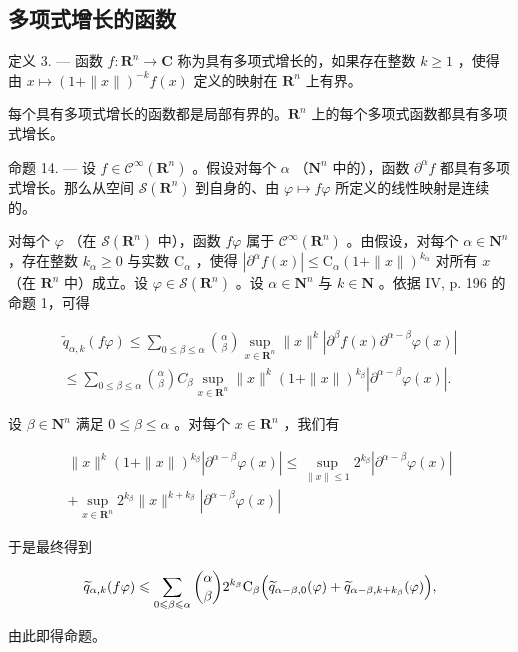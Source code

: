 \subsection{多项式增长的函数}

定义 3. --- 函数 \(f\colon\mathbf{R}^{n}\to\mathbf{C}\) 称为具有多项式增长的，如果存在整数 \(k\geqslant1\) ，使得由 \(x\mapsto(1+\|x\|)^{-k}f(x)\) 定义的映射在 \(\mathbf{R}^{n}\) 上有界。

每个具有多项式增长的函数都是局部有界的。\(\mathbf{R}^{n}\) 上的每个多项式函数都具有多项式增长。

命题 14. --- 设 \(f \in \mathcal{C}^{\infty}(\mathbf{R}^{n})\) 。假设对每个 \(\alpha\) （\(\mathbf{N}^{n}\) 中的），函数 \(\partial^{\alpha}f\) 都具有多项式增长。那么从空间 \(\mathcal{S}(\mathbf{R}^{n})\) 到自身的、由 \(\varphi \mapsto f\varphi\) 所定义的线性映射是连续的。

对每个 \(\varphi\) （在 \(\mathcal{S}(\mathbf{R}^{n})\) 中），函数 \(f\varphi\) 属于 \(\mathcal{C}^{\infty}(\mathbf{R}^{n})\) 。由假设，对每个 \(\alpha \in \mathbf{N}^{n}\) ，存在整数 \(k_{\alpha} \geqslant 0\) 与实数 \(\mathrm{C}_{\alpha}\) ，使得 \(|\partial^{\alpha}f(x)| \leqslant \mathrm{C}_{\alpha}(1 + \|x\|)^{k_{\alpha}}\) 对所有 \(x\) （在 \(\mathbf{R}^{n}\) 中）成立。设 \(\varphi \in \mathcal{S}(\mathbf{R}^{n})\) 。设 \(\alpha \in \mathbf{N}^{n}\) 与 \(k \in \mathbf{N}\) 。依据 IV, p. 196 的命题 1，可得

\[
\begin{array}{l} \widetilde {q} _ {\alpha , k} (f \varphi) \leqslant \sum_ {0 \leqslant \beta \leqslant \alpha} \binom {\alpha} {\beta} \sup _ {x \in \mathbf {R} ^ {n}} \| x \| ^ {k} | \partial^ {\beta} f (x)   \partial^ {\alpha - \beta} \varphi (x) | \\ \leqslant \sum_ {0 \leqslant \beta \leqslant \alpha} \binom {\alpha} {\beta} C _ {\beta} \sup _ {x \in \mathbf {R} ^ {n}} \| x \| ^ {k} (1 + \| x \|) ^ {k _ {\beta}} | \partial^ {\alpha - \beta} \varphi (x) |. \end{array}
\]

设 \(\beta \in \mathbf{N}^n\) 满足 \(0 \leqslant \beta \leqslant \alpha\) 。对每个 \(x \in \mathbf{R}^n\) ，我们有

\[
\begin{array}{c} \| x \| ^ {k} (1 + \| x \|) ^ {k _ {\beta}} | \partial^ {\alpha - \beta} \varphi (x) | \leqslant \sup _ {\| x \| \leqslant 1} 2 ^ {k _ {\beta}} | \partial^ {\alpha - \beta} \varphi (x) | \\ + \sup _ {x \in \mathbf {R} ^ {n}} 2 ^ {k _ {\beta}} \| x \| ^ {k + k _ {\beta}} | \partial^ {\alpha - \beta} \varphi (x) | \end{array}
\]

于是最终得到

\[
\widetilde {q} _ {\alpha , k} (f \varphi) \leqslant \sum_ {0 \leqslant \beta \leqslant \alpha} \binom {\alpha} {\beta} 2 ^ {k _ {\beta}} \mathrm{C} _ {\beta} \Bigl (\widetilde {q} _ {\alpha - \beta , 0} (\varphi) + \widetilde {q} _ {\alpha - \beta , k + k _ {\beta}} (\varphi) \Bigr),
\]

由此即得命题。

